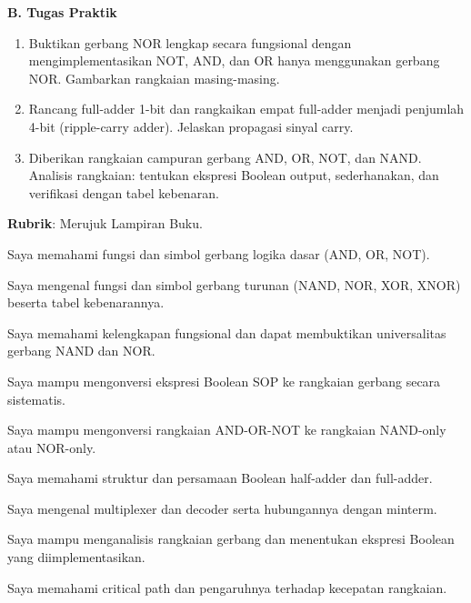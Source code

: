 \documentclass[../main]{subfiles}
\begin{document}
\begin{asesmen}
\textbf{B. Tugas Praktik}
\begin{enumerate}
  \item Buktikan gerbang NOR lengkap secara fungsional dengan mengimplementasikan NOT, AND, dan OR hanya menggunakan gerbang NOR. Gambarkan rangkaian masing-masing.
  \item Rancang full-adder 1-bit dan rangkaikan empat full-adder menjadi penjumlah 4-bit (ripple-carry adder). Jelaskan propagasi sinyal carry.
  \item Diberikan rangkaian campuran gerbang AND, OR, NOT, dan NAND. Analisis rangkaian: tentukan ekspresi Boolean output, sederhanakan, dan verifikasi dengan tabel kebenaran.
\end{enumerate}

\textbf{Rubrik}: Merujuk Lampiran Buku.
\end{asesmen}


\begin{checklist}
  \item Saya memahami fungsi dan simbol gerbang logika dasar (AND, OR, NOT).
  \item Saya mengenal fungsi dan simbol gerbang turunan (NAND, NOR, XOR, XNOR) beserta tabel kebenarannya.
  \item Saya memahami kelengkapan fungsional dan dapat membuktikan universalitas gerbang NAND dan NOR.
  \item Saya mampu mengonversi ekspresi Boolean SOP ke rangkaian gerbang secara sistematis.
  \item Saya mampu mengonversi rangkaian AND-OR-NOT ke rangkaian NAND-only atau NOR-only.
  \item Saya memahami struktur dan persamaan Boolean half-adder dan full-adder.
  \item Saya mengenal multiplexer dan decoder serta hubungannya dengan minterm.
  \item Saya mampu menganalisis rangkaian gerbang dan menentukan ekspresi Boolean yang diimplementasikan.
  \item Saya memahami critical path dan pengaruhnya terhadap kecepatan rangkaian.
\end{checklist}

\end{document}
